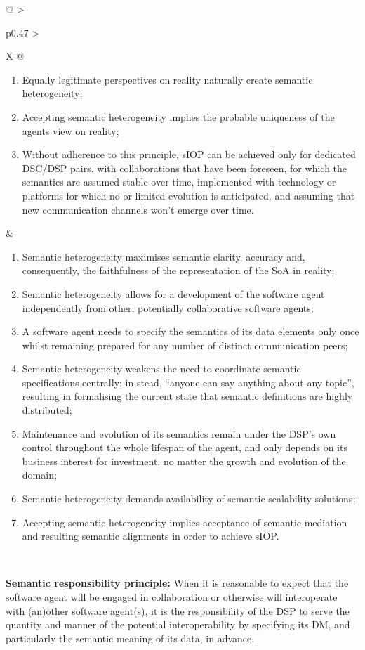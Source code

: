 \begin{xltabular}[l]{\linewidth}{@{} >{\small\raggedright\arraybackslash}p{0.47\linewidth} >{\small\raggedright\arraybackslash}X @{}}
\begin{enumerate}[left=6pt, nosep]
  \item Equally legitimate perspectives on reality naturally create semantic heterogeneity;
  \item Accepting semantic heterogeneity implies the probable uniqueness of the agents view on reality;
  \item Without adherence to this principle, sIOP can be achieved only for dedicated DSC/DSP pairs, with collaborations that have been foreseen, for which the semantics are assumed stable over time, implemented with technology or platforms for which no or limited evolution is anticipated, and assuming that new communication channels won't emerge over time.
\end{enumerate}
&
\begin{enumerate}[left=10pt, nosep]
  \item Semantic heterogeneity maximises semantic clarity, accuracy and, consequently, the faithfulness of the representation of the SoA in reality;
  \item Semantic heterogeneity allows for a development of the software agent independently from other, potentially collaborative software agents;
  \item A software agent needs to specify the semantics of its data elements only once whilst remaining prepared for any number of distinct communication peers;
  \item Semantic heterogeneity weakens the need to coordinate semantic specifications centrally; in stead, “anyone can say anything about any topic”, resulting in formalising the current state that semantic definitions are highly distributed;
  \item Maintenance and evolution of its semantics remain under the DSP’s own control throughout the whole lifespan of the agent, and only depends on its business interest for investment, no matter the growth and evolution of the domain;
  \item Semantic heterogeneity demands availability of semantic scalability solutions;
  \item Accepting semantic heterogeneity implies acceptance of semantic mediation and resulting semantic alignments in order to achieve sIOP.
\end{enumerate} \\
%
%
%
\begin{mmdp}\label{dp:rfsm}{\bfseries Semantic responsibility principle:}
\quad When it is reasonable to expect that the software agent will be engaged in collaboration or otherwise will interoperate with (an)other software agent(s), it is the responsibility of the DSP to serve the quantity and manner of the potential interoperability by specifying its DM, and particularly the semantic meaning of its data, in advance.

\end{mmdp}
\end{xltabular}
